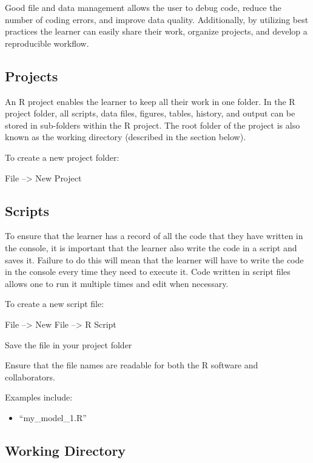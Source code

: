 \documentclass[
  letterpaper,
  DIV=11,
  numbers=noendperiod]{scrreprt}
\providecommand{\tightlist}{%
  \setlength{\itemsep}{0pt}\setlength{\parskip}{0pt}}\usepackage{longtable,booktabs,array}
\begin{document}
Good file and data management allows the user to debug code, reduce the
number of coding errors, and improve data quality. Additionally, by
utilizing best practices the learner can easily share their work,
organize projects, and develop a reproducible workflow.

\subsection{Projects}\label{projects}

An R project enables the learner to keep all their work in one folder.
In the R project folder, all scripts, data files, figures, tables,
history, and output can be stored in sub-folders within the R project.
The root folder of the project is also known as the working directory
(described in the section below).

To create a new project folder:

File --\textgreater{} New Project

\subsection{Scripts}\label{scripts}

To ensure that the learner has a record of all the code that they have
written in the console, it is important that the learner also write the
code in a script and saves it. Failure to do this will mean that the
learner will have to write the code in the console every time they need
to execute it. Code written in script files allows one to run it
multiple times and edit when necessary.

To create a new script file:

File --\textgreater{} New File --\textgreater{} R Script

Save the file in your project folder

Ensure that the file names are readable for both the R software and
collaborators.

Examples include:

\begin{itemize}
\tightlist
\item
  ``my\_model\_1.R''
\end{itemize}

\subsection{Working Directory}\label{working-directory}
\end{document}
